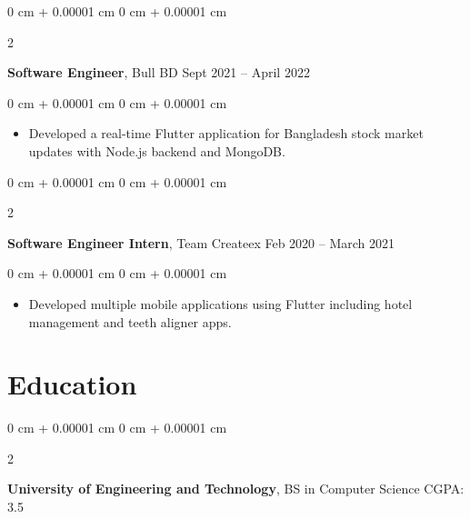 \documentclass[10pt, letterpaper]{article}
\newenvironment{highlights}{
    \begin{itemize}[
        topsep=0.10 cm,
        parsep=0.10 cm,
        partopsep=0pt,
        itemsep=0pt,
        leftmargin=0 cm + 10pt
    ]
}{
    \end{itemize}
} %
\newenvironment{onecolentry}{
    \begin{adjustwidth}{
        0 cm + 0.00001 cm
    }{
        0 cm + 0.00001 cm
    }
}{
    \end{adjustwidth}
} %
\newenvironment{twocolentry}[2][]{
    \onecolentry
    \def\secondColumn{#2}
    \setcolumnwidth{\fill, 4.5 cm}
    \begin{paracol}{2}
}{
    \switchcolumn \raggedleft \secondColumn
    \end{paracol}
    \endonecolentry
} %
\begin{document}
    \vspace{0.2 cm}

    \begin{twocolentry}{
        Sept 2021 – April 2022
    }
        \textbf{Software Engineer}, Bull BD\end{twocolentry}

    \vspace{0.10 cm}
    \begin{onecolentry}
        \begin{highlights}
            \item Developed a real-time Flutter application for Bangladesh stock market updates with Node.js backend and MongoDB.
        \end{highlights}
    \end{onecolentry}

    \vspace{0.2 cm}

    \begin{twocolentry}{
        Feb 2020 – March 2021
    }
        \textbf{Software Engineer Intern}, Team Createex\end{twocolentry}

    \vspace{0.10 cm}
    \begin{onecolentry}
        \begin{highlights}
            \item Developed multiple mobile applications using Flutter including hotel management and teeth aligner apps.
        \end{highlights}
    \end{onecolentry}

    \vspace{0.2 cm}

    \section{Education}
    \begin{twocolentry}{
        CGPA: 3.5
    }
        \textbf{University of Engineering and Technology}, BS in Computer Science\end{twocolentry}
\end{document}
